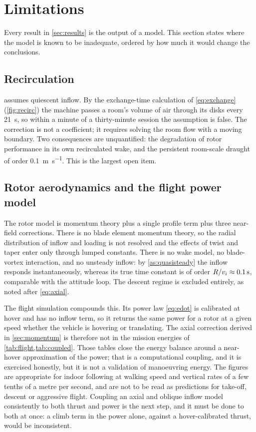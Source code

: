 ﻿\section{Limitations}
\label{sec:limitations}

Every result in \cref{sec:results} is the output of a model. This section
states where the model is known to be inadequate, ordered by how much it would
change the conclusions.

\subsection{Recirculation}

 assumes quiescent inflow. By the exchange-time calculation of
\cref{eq:exchange} (\cref{fig:recirc}) the machine passes a room's volume of air through its disks
every \SI{21}{\second}, so within a minute of a thirty-minute session the
assumption is false. The correction is not a coefficient; it requires solving
the room flow with a moving boundary. Two consequences are unquantified: the
degradation of rotor performance in its own recirculated wake, and the
persistent room-scale draught of order \SI{0.1}{\metre\per\second}. This is the
largest open item.

\subsection{Rotor aerodynamics and the flight power model}

The rotor model is momentum theory plus a single profile term plus three
near-field corrections. There is no blade element momentum theory, so the
radial distribution of inflow and loading is not resolved and the effects of
twist and taper enter only through lumped constants. There is no wake model, no
blade-vortex interaction, and no unsteady inflow: by \cref{as:quasisteady} the
inflow responds instantaneously, whereas its true time constant is of order
$R/v_i\approx\SI{0.1}{\second}$, comparable with the attitude loop. The
descent regime is excluded entirely, as noted after \cref{eq:axial}.

The flight simulation compounds this. Its power law \cref{eq:edot} is
calibrated at hover and has no inflow term, so it returns the same power for
a rotor at a given speed whether the vehicle is hovering or translating. The
axial correction derived in \cref{sec:momentum} is therefore not in the
mission energies of \cref{tab:flight,tab:coupled}. Those tables close the
energy balance around a near-hover approximation of the power; that is a
computational coupling, and it is exercised honestly, but it is not a
validation of manoeuvring energy. The figures are appropriate for indoor
following at walking speed and vertical rates of a few tenths of a metre per
second, and are not to be read as predictions for take-off, descent or
aggressive flight. Coupling an axial and oblique inflow model consistently to
both thrust and power is the next step, and it must be done to both at once:
a climb term in the power alone, against a hover-calibrated thrust, would be
inconsistent.

